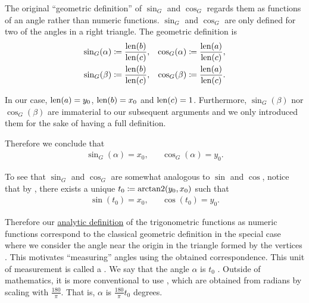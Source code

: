 \begin{definition}
  The original \enquote{geometric definition} of \( \sin_G \) and \( \cos_G \) regards them as functions of an angle rather than numeric functions. \( \sin_G \) and \( \cos_G \) are only defined for two of the angles in a right triangle. The geometric definition is
  \begin{align*}
    \sin_G(\alpha) \coloneqq \frac{\operatorname{len}(b)} {\operatorname{len}(c)}, && \cos_G(\alpha) \coloneqq \frac{\operatorname{len}(a)} {\operatorname{len}(c)},
    \\
    \sin_G(\beta) \coloneqq \frac{\operatorname{len}(b)} {\operatorname{len}(c)}, && \cos_G(\beta) \coloneqq \frac{\operatorname{len}(a)} {\operatorname{len}(c)}.
  \end{align*}

  In our case, \( \operatorname{len}(a) = y_0 \), \( \operatorname{len}(b) = x_0 \) and \( \operatorname{len}(c) = 1 \). Furthermore, \( \sin_G(\beta) \) nor \( \cos_G(
  \beta) \) are immaterial to our subsequent arguments and we only introduced them for the sake of having a full definition.

  Therefore we conclude that
  \begin{align*}
    \sin_G(\alpha) = x_0,
    &&
    \cos_G(\alpha) = y_0.
  \end{align*}

  To see that \( \sin_G \) and \( \cos_G \) are somewhat analogous to \( \sin \) and \( \cos \), notice that by , there exists a unique \( t_0 \coloneqq \operatorname{arctan2}(y_0, x_0) \) such that
  \begin{align*}
    \sin(t_0) = x_0,
    &&
    \cos(t_0) = y_0.
  \end{align*}

  Therefore our \hyperref[def:trigonometric_functions]{analytic definition} of the trigonometric functions as numeric functions correspond to the classical geometric definition in the special case where we consider the angle near the origin in the triangle formed by the vertices . This motivates \enquote{measuring} angles using the obtained correspondence. This unit of measurement is called a . We say that the angle \( \alpha \) is \( t_0 \) . Outside of mathematics, it is more conventional to use , which are obtained from radians by scaling with \( \tfrac {180} {\pi} \). That is, \( \alpha \) is \( \tfrac {180} {\pi} t_0 \) degrees.
\end{definition}
